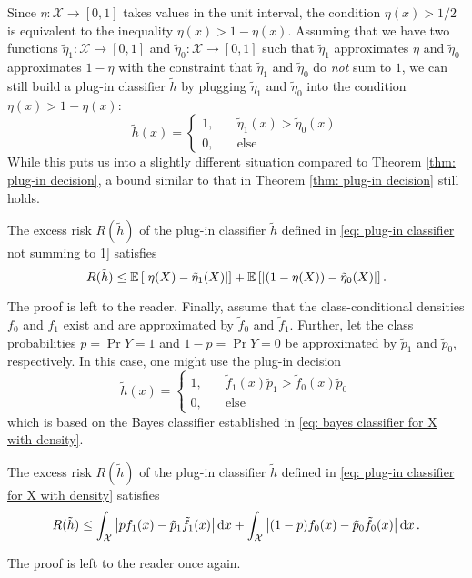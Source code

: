 Since $\eta \colon \mathcal{X} \to [0, 1]$ takes values in the unit interval, the condition $\eta(x) > 1/2$ is equivalent to the inequality $\eta(x) > 1 - \eta(x)$. Assuming that we have two functions $\tilde\eta_1 \colon \mathcal{X} \to [0, 1]$ and $\tilde\eta_0 \colon \mathcal{X} \to [0, 1]$ such that $\tilde\eta_1$ approximates $\eta$ and $\tilde\eta_0$ approximates $1 - \eta$ with the constraint that $\tilde\eta_1$ and $\tilde\eta_0$ do \emph{not} sum to $1$, we can still build a plug-in classifier $\tilde h$ by plugging $\tilde\eta_1$ and $\tilde\eta_0$ into the condition $\eta(x) > 1 - \eta(x)$:
\begin{equation}
\label{eq: plug-in classifier not summing to 1}
    \tilde h(x) = \begin{cases}
        1, \quad &\tilde\eta_1(x) > \tilde\eta_0(x) \\
        0, \quad &\text{else}
    \end{cases}
\end{equation}
While this puts us into a slightly different situation compared to Theorem \ref{thm: plug-in decision}, a bound similar to that in Theorem \ref{thm: plug-in decision} still holds.

\begin{theorem}
The excess risk $R(\tilde h)$ of the plug-in classifier $\tilde h$ defined in \eqref{eq: plug-in classifier not summing to 1} satisfies
\[
    R(\tilde h) \leq \mathbb{E}\left[\abs{\eta(X) - \tilde{\eta}_1(X)}\right] + \mathbb{E}\left[\abs{(1 - \eta(X)) - \tilde{\eta}_0(X)}\right].
\]
\end{theorem}

The proof is left to the reader. Finally, assume that the class-conditional densities $f_0$ and $f_1$ exist and are approximated by $\tilde f_0$ and $\tilde f_1$. Further, let the class probabilities $p = \Pr{Y=1}$ and $1-p = \Pr{Y=0}$ be approximated by $\tilde p_1$ and $\tilde p_0$, respectively. In this case, one might use the plug-in decision
\begin{equation}
\label{eq: plug-in classifier for X with density}
    \tilde h(x) = \begin{cases}
        1, \quad &\tilde f_1(x) \tilde p_1 > \tilde f_0(x) \tilde p_0 \\
        0, \quad &\text{else}
    \end{cases}
\end{equation}
which is based on the Bayes classifier established in \eqref{eq: bayes classifier for X with density}.

\begin{proposition}
The excess risk $R(\tilde h)$ of the plug-in classifier $\tilde h$ defined in \eqref{eq: plug-in classifier for X with density} satisfies
\[
    R(\tilde h) \leq \int_{\mathcal{X}} \big\lvert p f_1(x) - \tilde p_1 \tilde f_1(x) \big\rvert \,\mathrm{d}x + \int_{\mathcal{X}} \big\lvert (1-p) f_0(x) - \tilde p_0 \tilde f_0(x) \big\rvert \,\mathrm{d}x \, .
\]
\end{proposition}

The proof is left to the reader once again.
